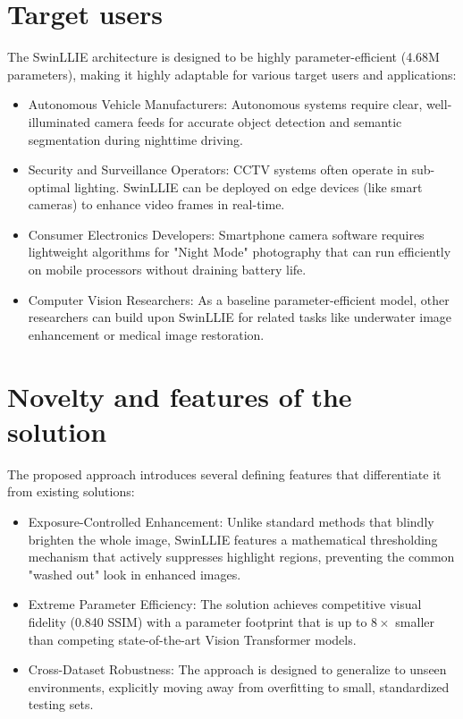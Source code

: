 \documentclass[12pt, a4paper]{report}
\begin{document}
\section{Target users}
The SwinLLIE architecture is designed to be highly parameter-efficient (4.68M parameters), making it highly adaptable for various target users and applications:
\begin{itemize}
    \item Autonomous Vehicle Manufacturers: Autonomous systems require clear, well-illuminated camera feeds for accurate object detection and semantic segmentation during nighttime driving.
    \item Security and Surveillance Operators: CCTV systems often operate in sub-optimal lighting. SwinLLIE can be deployed on edge devices (like smart cameras) to enhance video frames in real-time.
    \item Consumer Electronics Developers: Smartphone camera software requires lightweight algorithms for "Night Mode" photography that can run efficiently on mobile processors without draining battery life.
    \item Computer Vision Researchers: As a baseline parameter-efficient model, other researchers can build upon SwinLLIE for related tasks like underwater image enhancement or medical image restoration.
\end{itemize}

\section{Novelty and features of the solution}
The proposed approach introduces several defining features that differentiate it from existing solutions:
\begin{itemize}
    \item Exposure-Controlled Enhancement: Unlike standard methods that blindly brighten the whole image, SwinLLIE features a mathematical thresholding mechanism that actively suppresses highlight regions, preventing the common "washed out" look in enhanced images.
    \item Extreme Parameter Efficiency: The solution achieves competitive visual fidelity (0.840 SSIM) with a parameter footprint that is up to $8\times$ smaller than competing state-of-the-art Vision Transformer models.
    \item Cross-Dataset Robustness: The approach is designed to generalize to unseen environments, explicitly moving away from overfitting to small, standardized testing sets.
\end{itemize}
\end{document}
